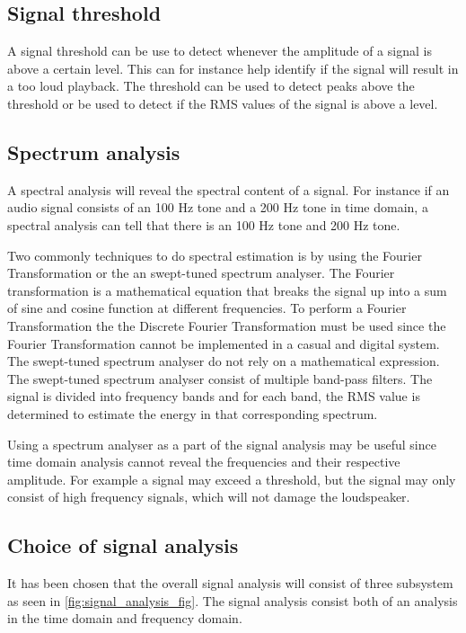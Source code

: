 \subsection*{Signal threshold}
A signal threshold can be use to detect whenever the amplitude of a signal is above a certain level. This can for instance help identify if the signal will result in a too loud playback. The threshold can be used to detect peaks above the threshold or be used to detect if the RMS values of the signal is above a level.


\subsection*{Spectrum analysis}
A spectral analysis will reveal the spectral content of a signal. For instance if an audio signal consists of an 100 Hz tone and a 200 Hz tone in time domain, a spectral analysis can tell that there is an 100 Hz tone and 200 Hz tone. 

Two commonly techniques to do spectral estimation is by using the Fourier Transformation or the an swept-tuned spectrum analyser. The Fourier transformation is a mathematical equation that breaks the signal up into a sum of sine and cosine function at different frequencies. To perform a Fourier Transformation the the Discrete Fourier Transformation must be used since the Fourier Transformation cannot be implemented in a casual and digital system. The swept-tuned spectrum analyser do not rely on a mathematical expression. The swept-tuned spectrum analyser consist of multiple band-pass filters. The signal is divided into frequency bands and for each band, the RMS value is determined to estimate the energy in that corresponding spectrum. 

Using a spectrum analyser as a part of the signal analysis may be useful since time domain analysis cannot reveal the frequencies and their respective amplitude. For example a signal may exceed a threshold, but the signal may only consist of high frequency signals, which will not damage the loudspeaker. 


\subsection{Choice of signal analysis}
It has been chosen that the overall signal analysis will consist of three subsystem as seen in \autoref{fig:signal_analysis_fig}. The signal analysis consist both of an analysis in the time domain and frequency domain.

